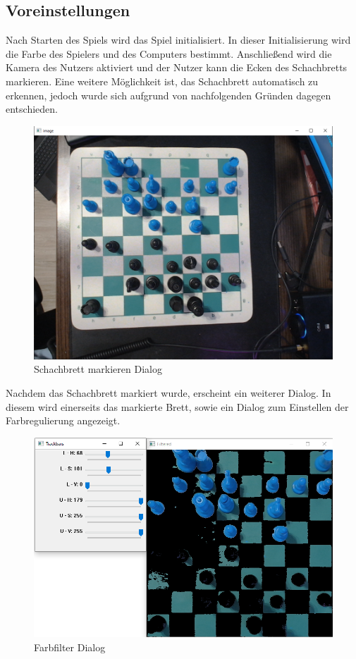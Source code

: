 \subsection{Voreinstellungen}
Nach Starten des Spiels wird das Spiel initialisiert. In dieser Initialisierung wird die Farbe des Spielers und des Computers bestimmt. 
Anschließend wird die Kamera des Nutzers aktiviert und der Nutzer kann die Ecken des Schachbretts markieren. Eine weitere Möglichkeit ist, das Schachbrett 
automatisch zu erkennen, jedoch wurde sich aufgrund von nachfolgenden Gründen dagegen entschieden.
\begin{figure}[H]
    \centering
    \includegraphics[scale=0.45]{images/scan_for_chessboard.png}
    \caption{Schachbrett markieren Dialog}
\end{figure}

Nachdem das Schachbrett markiert wurde, erscheint ein weiterer Dialog. In diesem wird einerseits das markierte Brett, sowie ein Dialog 
zum Einstellen der Farbregulierung angezeigt.
\begin{figure}[H]
    \centering
    \includegraphics[scale=0.45]{images/color_filter_selection.png}
    \caption{Farbfilter Dialog}
\end{figure}

